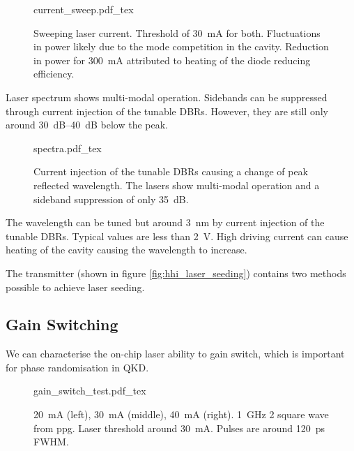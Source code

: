 \begin{figure}[tp]
	\centering
	\small	
	\def\svgwidth{0.9\textwidth} 
	{current_sweep.pdf_tex}
	\caption[Current sweep of HHI laser SOA]{Sweeping laser current. Threshold of \SI{30}{\mA} for both. Fluctuations in power likely due to the mode competition in the cavity. Reduction in power for \SI{300}{mA} attributed to heating of the diode reducing efficiency.}
	\label{fig:hhi_soa_sweep}
\end{figure}

Laser spectrum shows multi-modal operation. Sidebands can be suppressed through current injection of the tunable \acp{DBR}. However, they are still only around \SIrange{30}{40}{dB} below the peak. 

\begin{figure}[tp]
	\centering
	\small	
	\def\svgwidth{0.9\textwidth} 
	{spectra.pdf_tex}
	\caption[Wavelength sweep through current injection of tunable DBRs]{Current injection of the tunable \acp{DBR} causing a change of peak reflected wavelength. The lasers show multi-modal operation and a sideband suppression of only \SI{35}{dB}.}
	\label{fig:hhi_dbr_sweep}
\end{figure}

The wavelength can be tuned but around \SI{3}{nm} by current injection of the tunable \acp{DBR}. Typical values are less than \SI{2}{V}. High driving current can cause heating of the cavity causing the wavelength to increase. 

The transmitter (shown in figure \ref{fig:hhi_laser_seeding}) contains two methods possible to achieve laser seeding.

\subsection{Gain Switching}

We can characterise the on-chip laser ability to gain switch, which is important for phase randomisation in \ac{QKD}. 

\begin{figure}[tp]
	\centering
	\small	
	\def\svgwidth{\textwidth} 
	{gain_switch_test.pdf_tex}
	\caption[Gain switching test of the HHI on-chip lasers]{\SI{20}{mA} (left), \SI{30}{\mA} (middle), \SI{40}{\mA} (right). \SI{1}{GHz} \SI{2}{\Vpp} square wave from \ac{ppg}. Laser threshold around \SI{30}{mA}. Pulses are around \SI{120}{ps} \ac{FWHM}.}
	\label{fig:gain_switch_test}
\end{figure}

